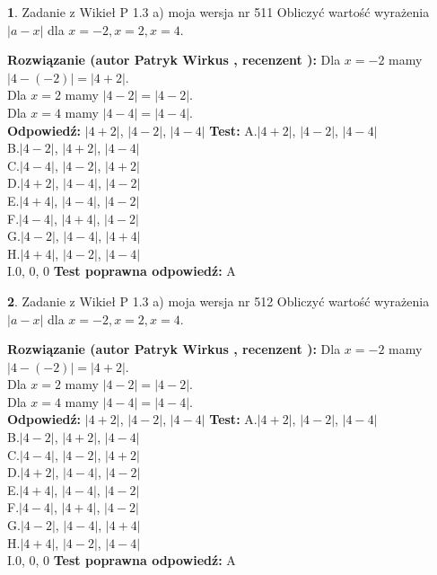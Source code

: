 \documentclass[12pt, a4paper]{article}
\theoremstyle{definition} %
\newtheorem{zad}{}
\newcommand{\zadStart}[1]{\begin{zad}#1\newline}
\newcommand{\zadStop}{\end{zad}}
\newcommand{\rozwStart}[2]{\noindent \textbf{Rozwiązanie (autor #1 , recenzent #2): }\newline}
\newcommand{\rozwStop}{\newline}
\newcommand{\odpStart}{\noindent \textbf{Odpowiedź:}\newline}
\newcommand{\odpStop}{\newline}
\newcommand{\testStart}{\noindent \textbf{Test:}\newline}
\newcommand{\testStop}{\newline}
\newcommand{\kluczStart}{\noindent \textbf{Test poprawna odpowiedź:}\newline}
\newcommand{\kluczStop}{\newline}
\begin{document}
\zadStart{Zadanie z Wikieł P 1.3 a) moja wersja nr 511}
Obliczyć wartość wyrażenia $|a - x|$ dla $x=-2,x=2,x=4$.
\zadStop
\rozwStart{Patryk Wirkus}{}
Dla $x = -2$ mamy $|4 - (-2)| = |4 + 2|$.\\
Dla $x = 2$ mamy $|4 - 2| = |4 - 2|$.\\
Dla $x = 4$ mamy $|4 - 4| = |4 - 4|$.\\
\rozwStop
\odpStart
$|4 + 2|$, $|4 - 2|$, $|4 - 4|$
\odpStop
\testStart
A.$|4 + 2|$, $|4 - 2|$, $|4 - 4|$\\
B.$|4 - 2|$, $|4 + 2|$, $|4 - 4|$\\
C.$|4 - 4|$, $|4 - 2|$, $|4 + 2|$\\
D.$|4 + 2|$, $|4 - 4|$, $|4 - 2|$\\
E.$|4 + 4|$, $|4 - 4|$, $|4 - 2|$\\
F.$|4 - 4|$, $|4 + 4|$, $|4 - 2|$\\
G.$|4 - 2|$, $|4 - 4|$, $|4 + 4|$\\
H.$|4 + 4|$, $|4 - 2|$, $|4 - 4|$\\
I.$0$, $0$, $0$
\testStop
\kluczStart
A
\kluczStop



\zadStart{Zadanie z Wikieł P 1.3 a) moja wersja nr 512}
Obliczyć wartość wyrażenia $|a - x|$ dla $x=-2,x=2,x=4$.
\zadStop
\rozwStart{Patryk Wirkus}{}
Dla $x = -2$ mamy $|4 - (-2)| = |4 + 2|$.\\
Dla $x = 2$ mamy $|4 - 2| = |4 - 2|$.\\
Dla $x = 4$ mamy $|4 - 4| = |4 - 4|$.\\
\rozwStop
\odpStart
$|4 + 2|$, $|4 - 2|$, $|4 - 4|$
\odpStop
\testStart
A.$|4 + 2|$, $|4 - 2|$, $|4 - 4|$\\
B.$|4 - 2|$, $|4 + 2|$, $|4 - 4|$\\
C.$|4 - 4|$, $|4 - 2|$, $|4 + 2|$\\
D.$|4 + 2|$, $|4 - 4|$, $|4 - 2|$\\
E.$|4 + 4|$, $|4 - 4|$, $|4 - 2|$\\
F.$|4 - 4|$, $|4 + 4|$, $|4 - 2|$\\
G.$|4 - 2|$, $|4 - 4|$, $|4 + 4|$\\
H.$|4 + 4|$, $|4 - 2|$, $|4 - 4|$\\
I.$0$, $0$, $0$
\testStop
\kluczStart
A
\kluczStop
\end{document}
